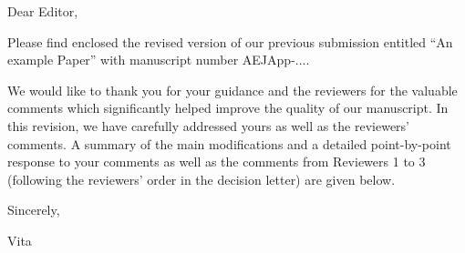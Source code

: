 Dear Editor,

\bigskip

Please find enclosed the revised version of our previous submission entitled \enquote{An example Paper} with manuscript number AEJApp-....

We would like to thank you for your guidance and the reviewers for the valuable comments which significantly helped improve the quality of our manuscript.
In this revision, we have carefully addressed yours as well as the reviewers' comments. A summary of the main modifications and a detailed point-by-point response to your comments as well as the comments from Reviewers 1 to 3 (following the reviewers' order in the decision letter) are given below.

\vspace{1.2em}

Sincerely,

\vspace{1.7em}

Vita

\newpage

